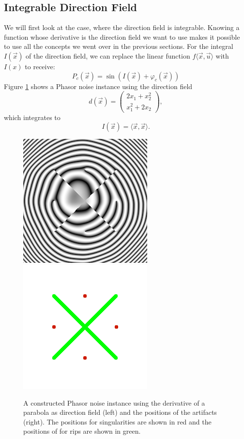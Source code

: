 \documentclass{utue} %
\begin{document}
\subsection{Integrable Direction Field}
We will first look at the case, where the direction field is integrable. Knowing a function whose derivative is the direction field we want to use makes it possible to use all the concepts we went over in the previous sections. For the integral $I(\vec{x})$ of the direction field, we can replace the linear function $f\langle\vec{x},\vec{u}\rangle$ with $I(x)$ to receive:
$$
P_c(\vec{x}) = \sin(I(\vec{x})+\varphi_c(\vec{x}))
$$
Figure \ref{fig:parabola} shows a Phasor noise instance using the direction field
$$
d(\vec{x}) = \begin{pmatrix}
2x_1+x_2^2\\
x_1^2+2x_2
\end{pmatrix},
$$
which integrates to
$$
I(\vec{x}) = \langle \vec{x},\vec{x} \rangle.
$$

\begin{figure}[ht]
  \centering
  \includegraphics[width=0.49\linewidth]{images/paraboloidDir}
  \includegraphics[width=0.49\linewidth]{images/combiningArtifactsPositions}
  \caption{A constructed Phasor noise instance using the derivative of a parabola as direction field (left) and the positions of the artifacts (right). The positions for singularities are shown in red and the positions of for rips are shown in green.}\label{fig:parabola}
\end{figure}
\end{document}
